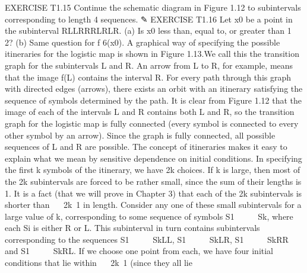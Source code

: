 \documentclass{article}
\begin{document}
EXERCISE T1.15
Continue the schematic diagram in Figure 1.12 to subintervals corresponding
to length 4 sequences.
✎ EXERCISE T1.16
Let x0 be a point in the subinterval RLLRRRLRLR. (a) Is x0 less than, equal
to, or greater than 1  2? (b) Same question for f 6(x0).
A graphical way of specifying the possible itineraries for the logistic map is
shown in Figure 1.13.We call this the transition graph for the subintervals L and
R. An arrow from L to R, for example, means that the image f(L) contains the
interval R. For every path through this graph with directed edges (arrows), there
exists an orbit with an itinerary satisfying the sequence of symbols determined
by the path. It is clear from Figure 1.12 that the image of each of the intervals L
and R contains both L and R, so the transition graph for the logistic map is fully
connected (every symbol is connected to every other symbol by an arrow). Since
the graph is fully connected, all possible sequences of L and R are possible.
The concept of itineraries makes it easy to explain what we mean by
sensitive dependence on initial conditions. In specifying the first k symbols of the
itinerary, we have 2k choices. If k is large, then most of the 2k subintervals are
forced to be rather small, since the sum of their lengths is 1. It is a fact (that we
will prove in Chapter 3) that each of the 2k subintervals is shorter than    2k 1
in length.
Consider any one of these small subintervals for a large value of k, corresponding
to some sequence of symbols S1       Sk, where each Si is either R or L.
This subinterval in turn contains subintervals corresponding to the sequences
S1       SkLL, S1       SkLR, S1       SkRR and S1       SkRL. If we choose one point from
each, we have four initial conditions that lie within    2k 1 (since they all lie
\end{document}
